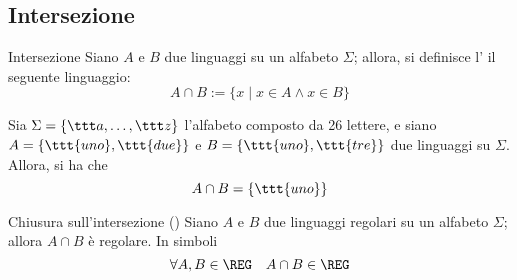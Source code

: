 \documentclass[a4paper, 12pt]{report}
\begin{document}
    \subsection{Intersezione}

    \begin{frameddefn}{Intersezione}
        Siano $A$ e $B$ due linguaggi su un alfabeto $\Sigma$; allora, si definisce l' il seguente linguaggio: $$A \cap B := \{x \mid x \in A \land x \in B \}$$
    \end{frameddefn}

    \begin{example}[Intersezione]
        Sia $\Sigma = \{\ttt a , \ldots, \ttt z\}$ l'alfabeto composto da 26 lettere, e siano $A = \{\ttt{uno}, \ttt{due}\}$ e $B = \{\ttt{uno}, \ttt{tre}\}$ due linguaggi su $\Sigma$. Allora, si ha che $$A \cap B = \{\ttt{uno}\}$$
    \end{example}

    \begin{framedprop}[label={closure inters}]{Chiusura sull'intersezione (\REG)}
        Siano $A$ e $B$ due linguaggi regolari su un alfabeto $\Sigma$; allora $A \cap B$ è regolare. In simboli $$\forall A, B \in \REG \quad A \cap B \in \REG$$
    \end{framedprop}
\end{document}
